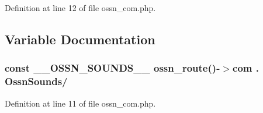 Definition at line 12 of file ossn\+\_\+com.\+php.



\subsection{Variable Documentation}
\subsubsection[{\texorpdfstring{\+\_\+\+\_\+\+O\+S\+S\+N\+\_\+\+S\+O\+U\+N\+D\+S\+\_\+\+\_\+}{__OSSN_SOUNDS__}}]{\setlength{\rightskip}{0pt plus 5cm}const \+\_\+\+\_\+\+O\+S\+S\+N\+\_\+\+S\+O\+U\+N\+D\+S\+\_\+\+\_\+ {\bf ossn\+\_\+route}()-\/$>$com . \textquotesingle{}Ossn\+Sounds/\textquotesingle{}}\hypertarget{_ossn_sounds_2ossn__com_8php_ab3a03e46c7dd1cc6a5f29ccf64b72a0d}{}\label{_ossn_sounds_2ossn__com_8php_ab3a03e46c7dd1cc6a5f29ccf64b72a0d}


Definition at line 11 of file ossn\+\_\+com.\+php.

